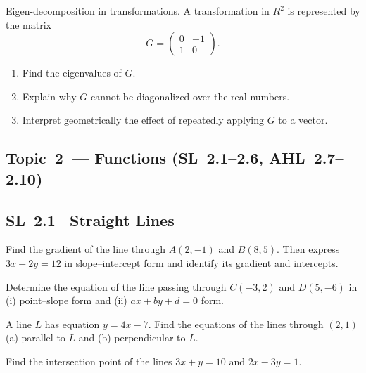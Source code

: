 \documentclass[11pt]{article}
\def\textbf#1{#1}%
\def\texttt#1{#1}%
\def\mathbb#1{#1}%
\newcommand{\tocsubsection}[1]{\subsection{#1}}
\newcounter{question}
\begin{document}
\begin{question}
\textbf{Eigen-decomposition in transformations.}
A transformation in $\mathbb{R}^2$ is represented by the matrix
\[
G = \begin{pmatrix} 0 & -1 \\ 1 & 0 \end{pmatrix}.
\]
\begin{enumerate}
    \item Find the eigenvalues of $G$.
    \item Explain why $G$ cannot be diagonalized over the real numbers.
    \item Interpret geometrically the effect of repeatedly applying $G$ to a vector.
\end{enumerate}
\end{question}


\tocsubsection{Topic 2 — Functions (SL 2.1–2.6, AHL 2.7–2.10)}

\tocsubsection{SL 2.1 \; Straight Lines}

\begin{question}
Find the gradient of the line through $A(2,-1)$ and $B(8,5)$.  Then express
$3x-2y=12$ in slope–intercept form and identify its gradient and intercepts.
\end{question}

\begin{question}
Determine the equation of the line passing through $C(-3,2)$ and $D(5,-6)$ in
(i) point–slope form and (ii) $ax+by+d=0$ form.
\end{question}

\begin{question}
A line $L$ has equation $y=4x-7$.  Find the equations of the lines through
$(2,1)$ (a) parallel to $L$ and (b) perpendicular to $L$.
\end{question}

\begin{question}
Find the intersection point of the lines $3x+y=10$ and $2x-3y=1$.
\end{question}
\end{document}
